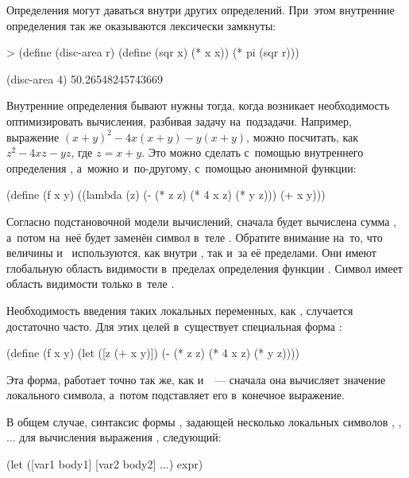 Определения могут даваться внутри других определений. При~этом внутренние определения так же оказываются лексически замкнуты:

\begin{SchemeCode}[emph={x,r}]
   > (define (disc-area r)
       (define (sqr x) (* x x))
       (* pi (sqr r)))
\end{SchemeCode}
\REPL
  {(disc-area 4)}
  {50.26548245743669}

Внутренние определения бывают нужны тогда, когда возникает необходимость оптимизировать вычисления, разбивая задачу на~подзадачи. Например, выражение $(x + y)^2- 4x(x + y)-y(x + y)$, можно посчитать, как $z^2-4xz-yz$, где $z = x + y$. Это можно сделать с~помощью внутреннего определения , а~можно и~по-другому, с~помощью анонимной функции:

\begin{Definition}[emph={x,y,z}]
(define (f x y)
  ((lambda (z) (- (* z z) (* 4 x z) (* y z)))
   (+ x y)))
\end{Definition}

Согласно подстановочной модели вычислений, сначала будет вычислена сумма , а~потом на~неё будет заменён символ  в~теле . Обратите внимание на~то, что величины  и~ используются, как внутри , так и~за её пределами. Они имеют глобальную область видимости в~пределах определения функции . Символ  имеет область видимости только в~теле .

Необходимость введения таких локальных переменных, как , случается достаточно часто. Для этих целей в~\Scheme существует специальная форма :

\begin{Definition}[emph={x,y,z}]
(define (f x y)
  (let ([z (+ x y)])
    (- (* z z) (* 4 x z) (* y z))))
\end{Definition}

Эта форма, работает точно так же, как и~~--- сначала она вычисляет значение локального символа, а~потом подставляет его в~конечное выражение.

В общем случае, синтаксис формы , задающей несколько локальных символов , , ... для вычисления выражения , следующий:
\begin{SchemeCode}
(let ([var1 body1]
      [var2 body2] ...)
  expr)
\end{SchemeCode}


